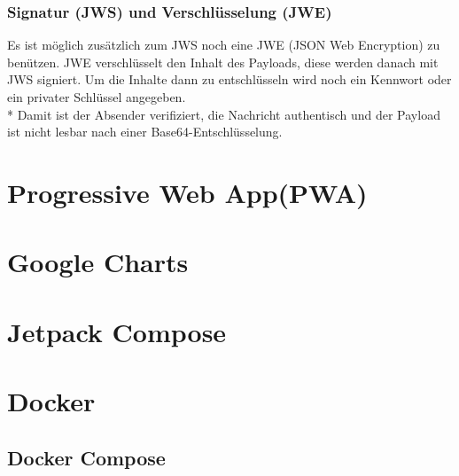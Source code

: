 \subsubsection{Signatur (JWS) und Verschlüsselung (JWE)}
Es ist möglich zusätzlich zum JWS noch eine JWE (JSON Web Encryption) zu benützen. JWE verschlüsselt den Inhalt des Payloads, diese werden danach mit JWS signiert.
Um die Inhalte dann zu entschlüsseln wird noch ein Kennwort oder ein privater Schlüssel angegeben. \\*
Damit ist der Absender verifiziert, die Nachricht authentisch und der Payload ist nicht lesbar nach einer Base64-Entschlüsselung. \cite{JWTIONOS}
\section{Progressive Web App(PWA)}

\section{Google Charts}

\section{Jetpack Compose}

\section{Docker}
\subsection{Docker Compose}
